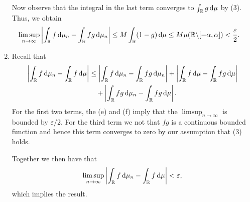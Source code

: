 \documentclass{lecturenotes}
\begin{document}
\begin{enumerate}[label={(\alph*)}]
Now observe that the integral in the last term converges to $\int_{\mathbb R} g \, \mathrm{d} \mu$ by (3). Thus, we obtain
\begin{align*}
	\limsup_{n \to \infty} \left|\int_{\mathbb R} f \, \mathrm{d} \mu_n - \int_{\mathbb R} fg \, \mathrm{d} \mu_n\right|
	&\le M \int_{\mathbb R} (1-g) \, \mathrm{d} \mu \le M \mu(\mathbb R \backslash [-\alpha,\alpha]) < \frac{\varepsilon}{2}.
\end{align*}
\item 
Recall that
\begin{align*}
	\left|\int_{\mathbb R} f \, \mathrm{d} \mu_n - \int_{\mathbb R} f \, \mathrm{d} \mu\right| &\le \left|\int_{\mathbb R} f \, \mathrm{d} \mu_n - \int_{\mathbb R} fg \, \mathrm{d} \mu_n\right| + \left|\int_{\mathbb R} f \, \mathrm{d} \mu - \int_{\mathbb R} fg \, \mathrm{d} \mu\right|\\ &\hspace{10pt}+ \left|\int_{\mathbb R} fg \, \mathrm{d} \mu_n - \int_{\mathbb R} fg \, \mathrm{d} \mu\right|.
\end{align*}
For the first two terms, the (e) and (f) imply that the $\limsup_{n \to \infty}$ is bounded by $\varepsilon/2$. For the third term we not that $fg$ is a continuous bounded function and hence this term converges to zero by our assumption that (3) holds.

Together we then have that
\[
	\limsup_{n \to \infty} \left|\int_{\mathbb R} f \, \mathrm{d} \mu_n - \int_{\mathbb R} f \, \mathrm{d} \mu\right| < \varepsilon,
\]
which implies the result.
\end{enumerate}
\end{document}
